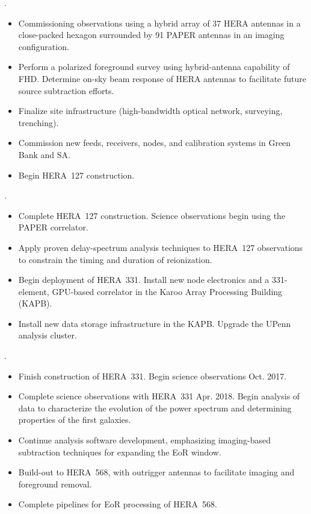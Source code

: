 \documentclass[preprint]{aastex}
\begin{document}
\vspace{-7pt}
.  
\begin{itemize}\setlength{\parskip}{0pt}\itemsep0pt
\vspace{-7pt}
  \item Commissioning observations using a hybrid array of 37 HERA antennas in a close-packed hexagon surrounded by 91 PAPER antennas in an imaging configuration.
  \item Perform a polarized foreground survey using hybrid-antenna capability of FHD. Determine on-sky beam response of HERA antennas to facilitate future source subtraction efforts.
  \item Finalize site infrastructure (high-bandwidth optical network, surveying, trenching).
  \item Commission new feeds, receivers, nodes, and calibration systems in Green Bank and SA.
  \item Begin HERA~127 construction.
\end{itemize}

\vspace{-7pt}
.
\begin{itemize}\setlength{\parskip}{0pt}\itemsep0pt
\vspace{-7pt}
  \item Complete HERA~127 construction. Science observations begin using the PAPER correlator.
  \item Apply proven delay-spectrum analysis techniques to HERA~127 observations to constrain 
the timing and duration of reionization. 
  \item Begin deployment of HERA~331. Install new node electronics and a 331-element, 
GPU-based correlator in the Karoo Array Processing Building (KAPB).
  \item  Install new data storage infrastructure in the KAPB.  
Upgrade the UPenn analysis cluster.
\end{itemize}

\vspace{-7pt}
.
\begin{itemize}\setlength{\parskip}{0pt}\itemsep0pt
\vspace{-7pt}
  \item Finish construction of HERA~331. Begin science observations Oct. 2017.
  \item Complete science observations with HERA~331 Apr. 2018. Begin analysis of data to
characterize the evolution of the power spectrum and determining properties of the first galaxies.
  \item Continue analysis software development, emphasizing imaging-based subtraction techniques for expanding the EoR window.
  \item Build-out to HERA~568, with outrigger antennas to facilitate imaging and foreground removal.
  \item Complete pipelines for EoR processing of HERA~568.
\end{itemize}
\end{document}
